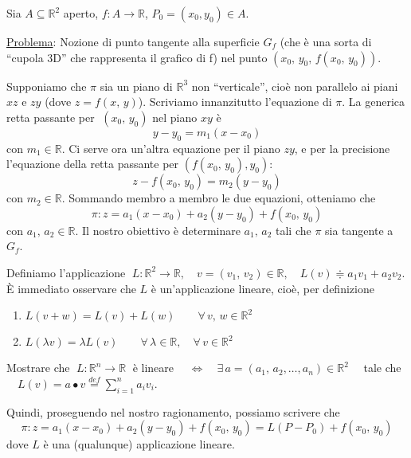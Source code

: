 Sia $A \subseteq \mathbb{R}^2$ aperto, $f:A \longrightarrow \mathbb{R}$, $P_0=(x_0,y_0) \in A$.

\begin{center}
\def\svgwidth{12cm}

\end{center}

\underline{Problema}: Nozione di punto tangente alla superficie $G_f$ (che è una sorta di ``cupola 3D'' che rappresenta il grafico di f) nel punto $(x_0,\,y_0,\,f(x_0,\,y_0))$.

Supponiamo che $\pi$ sia un piano di $\mathbb{R}^3$ non ``verticale'', cioè non parallelo ai piani $xz$ e $zy$ (dove $z=f(x,\,y)$).
Scriviamo innanzitutto l'equazione di $\pi$. La generica retta passante per $\; (x_0,\,y_0)$ nel piano $xy$ è
$$y-y_0=m_1(x-x_0)$$
con $m_1 \in \mathbb{R}$.
Ci serve ora un'altra equazione per il piano $zy$, e per la precisione l'equazione della retta passante per $(f(x_0,\,y_0),y_0)$:
$$z - f(x_0,\,y_0) = m_2(y-y_0)$$
con $m_2 \in \mathbb{R}$. Sommando membro a membro le due equazioni, otteniamo che
$$\pi : z = a_1(x-x_0) + a_2(y-y_0) + f(x_0,\,y_0)$$
con $a_1,\,a_2 \in \mathbb{R}$.
Il nostro obiettivo è determinare $a_1,\,a_2$ tali che $\pi$ sia tangente a $G_f$.

Definiamo l'applicazione $\; L:\mathbb{R}^2 \longrightarrow \mathbb{R}, \quad v=(v_1,\,v_2) \in \mathbb{R}, \quad L(v) \doteqdot a_1v_1 + a_2v_2$. \`E immediato osservare che $L$ è un'applicazione lineare, cioè, per definizione
\begin{enumerate}[labelindent=\parindent,leftmargin=*,label=\textnormal{(Lin\arabic*)},start=1]
\item $L(v+w)=L(v)+L(w) \qquad \forall \, v,\,w \in \mathbb{R}^2$
\item $L(\lambda v) = \lambda L(v) \qquad \forall \, \lambda \in \mathbb{R}, \quad \forall \, v \in \mathbb{R}^2$
\end{enumerate}

\begin{exer}
Mostrare che $\; L:\mathbb{R}^n \longrightarrow \mathbb{R} \;$ è lineare $\quad \Longleftrightarrow \quad \exists \, a=(a_1,\,a_2,\ldots,a_n) \in \mathbb{R}^2 \quad$ tale che $\quad L(v) = a \bullet v \overset{def}{=} \displaystyle \sum_{i=1}^n a_i v_i$.
\end{exer}

Quindi, proseguendo nel nostro ragionamento, possiamo scrivere che
$$\pi : z = a_1(x-x_0) + a_2(y-y_0) + f(x_0,\,y_0) = L(P-P_0) + f(x_0,\,y_0)$$
dove $L$ è una (qualunque) applicazione lineare.

